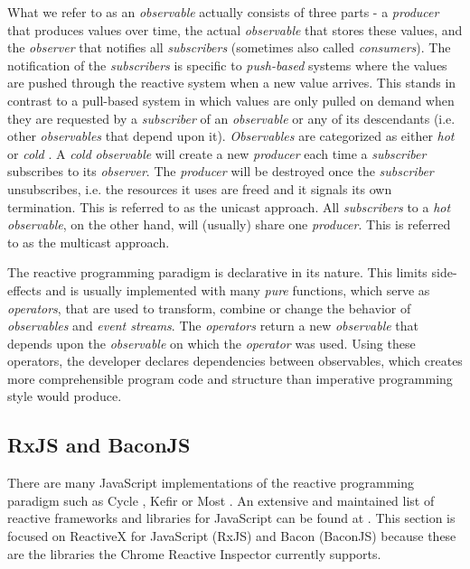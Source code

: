 	What we refer to as an \emph{observable} actually consists of three parts - a \emph{producer} that produces values over time, the actual \emph{observable} that stores these values, and the \emph{observer} that notifies all \emph{subscribers} (sometimes also called \emph{consumers}). The notification of the \emph{subscribers} is specific to \emph{push-based} systems where the values are pushed through the reactive system when a new value arrives. This stands in contrast to a pull-based system in which values are only pulled on demand when they are requested by a \emph{subscriber} of an \emph{observable} or any of its descendants (i.e. other \emph{observables} that depend upon it).
	\emph{Observables} are categorized as either \emph{hot} or \emph{cold} \cite{HotVsCold}. A \emph{cold} \emph{observable} will create a new \emph{producer} each time a \emph{subscriber} subscribes to its \emph{observer}. The \emph{producer} will be destroyed once the \emph{subscriber} unsubscribes, i.e. the resources it uses are freed and it signals its own termination. This is referred to as the unicast approach. All \emph{subscribers} to a \emph{hot} \emph{observable}, on the other hand, will (usually) share one \emph{producer}. This is referred to as the multicast approach.
	
	The reactive programming paradigm is declarative in its nature. This limits side-effects and is usually implemented with many \emph{pure} functions, which serve as \emph{operators}, that are used to transform, combine or change the behavior of \emph{observables} and \emph{event streams}. The \emph{operators} return a new \emph{observable} that depends upon the \emph{observable} on which the \emph{operator} was used. Using these operators, the developer declares dependencies between observables, which creates more comprehensible program code and structure \cite[Why Reactive Programming?]{ReactiveInspector} than imperative programming style would produce.

	\subsection{RxJS and BaconJS}
	There are many JavaScript implementations of the reactive programming paradigm such as Cycle \cite{CycleJS}, Kefir \cite{KefirJS} or Most \cite{MostJS}. An extensive and maintained list of reactive frameworks and libraries for JavaScript can be found at \cite{FRPJSList}. This section is focused on ReactiveX for JavaScript (RxJS) \cite{RxJS} and Bacon (BaconJS) \cite{BaconJS} because these are the libraries the Chrome Reactive Inspector currently supports.
	
